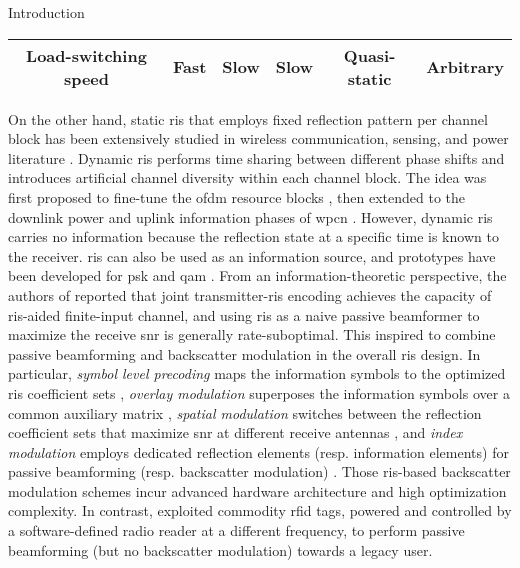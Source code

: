 \documentclass[journal]{IEEEtran}
\begin{document}
\begin{section}{Introduction}
\begin{table*}[!t]
\begin{tabularx}{\textwidth}{CCCCCC}
			Load-switching speed                   & Fast                                    & Slow                        & Slow                                                                & Quasi-static        & Arbitrary                                                          \\ \bottomrule
		\end{tabularx}
	\end{table*}

	On the other hand, static \gls{ris} that employs fixed reflection pattern per channel block has been extensively studied in wireless communication, sensing, and power literature \cite{Wu2018,Zhang2019a,Lin2022,Liu2022,Feng2022,Zhao2022}.
	Dynamic \gls{ris} performs time sharing between different phase shifts and introduces artificial channel diversity within each channel block.
	The idea was first proposed to fine-tune the \gls{ofdm} resource blocks \cite{Yang2020}, then extended to the downlink power and uplink information phases of \gls{wpcn} \cite{Wu2021,Wu2021d,Hua2022a}.
	However, dynamic \gls{ris} carries no information because the reflection state at a specific time is known to the receiver.
	\gls{ris} can also be used as an information source, and prototypes have been developed for \gls{psk} \cite{Tang2019a} and \gls{qam} \cite{Dai2020a}.
	From an information-theoretic perspective, the authors of \cite{Karasik2020} reported that joint transmitter-\gls{ris} encoding achieves the capacity of \gls{ris}-aided finite-input channel, and using \gls{ris} as a naive passive beamformer to maximize the receive \gls{snr} is generally rate-suboptimal.
	This inspired \cite{Liu2019d,Bereyhi2020,Xu2020b,Zhang2021d,Hu2021b,Hua2022,Basar2020,Ma2020a,Yuan2021,Hu2021a} to combine passive beamforming and backscatter modulation in the overall \gls{ris} design.
	In particular, \emph{symbol level precoding} maps the information symbols to the optimized \gls{ris} coefficient sets \cite{Liu2019d,Bereyhi2020}, \emph{overlay modulation} superposes the information symbols over a common auxiliary matrix \cite{Xu2020b,Zhang2021d,Hu2021b,Hua2022}, \emph{spatial modulation} switches between the reflection coefficient sets that maximize \gls{snr} at different receive antennas \cite{Basar2020,Ma2020a,Yuan2021}, and \emph{index modulation} employs dedicated reflection elements (resp. information elements) for passive beamforming (resp. backscatter modulation) \cite{Hu2021a}.
	Those \gls{ris}-based backscatter modulation schemes incur advanced hardware architecture and high optimization complexity.
	In contrast, \cite{Vardakis2023} exploited commodity \gls{rfid} tags, powered and controlled by a software-defined radio reader at a different frequency, to perform passive beamforming (but no backscatter modulation) towards a legacy user. \label{cm:2.5}

\end{section}
\end{document}
